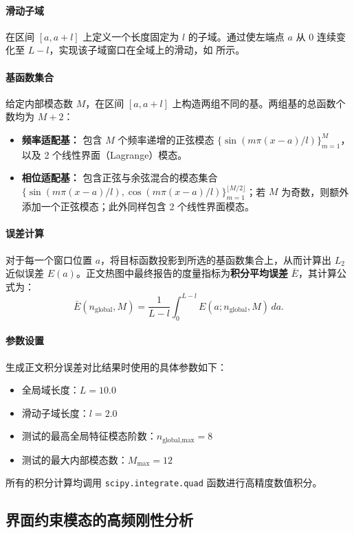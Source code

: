 \paragraph{滑动子域}
在区间 $[a, a+l]$ 上定义一个长度固定为 $l$ 的子域。通过使左端点 $a$ 从 $0$ 连续变化至 $L-l$，实现该子域窗口在全域上的滑动，如  所示。

\paragraph{基函数集合}
给定内部模态数 $M$，在区间 $[a, a+l]$ 上构造两组不同的基。两组基的总函数个数均为 $M+2$：
\begin{itemize}
    \item \textbf{频率适配基：} 包含 $M$ 个频率递增的正弦模态 $\{ \sin(m\pi(x-a)/l) \}_{m=1}^M$，以及 2 个线性界面（Lagrange）模态。
    \item \textbf{相位适配基：} 包含正弦与余弦混合的模态集合 $\{ \sin(m\pi(x-a)/l), \cos(m\pi(x-a)/l) \}_{m=1}^{\lfloor M/2 \rfloor}$；若 $M$ 为奇数，则额外添加一个正弦模态；此外同样包含 2 个线性界面模态。
\end{itemize}

\paragraph{误差计算}
对于每一个窗口位置 $a$，将目标函数投影到所选的基函数集合上，从而计算出 $L_2$ 近似误差 $E(a)$。正文热图中最终报告的度量指标为\textbf{积分平均误差} $\bar{E}$，其计算公式为：
\begin{equation}
\bar{E}(n_{\text{global}}, M) = \frac{1}{L-l} \int_{0}^{L-l} E(a; n_{\text{global}}, M) \, da.
\end{equation}

\paragraph{参数设置}
生成正文积分误差对比结果时使用的具体参数如下：
\begin{itemize}
    \item 全局域长度：$L = 10.0$
    \item 滑动子域长度：$l = 2.0$
    \item 测试的最高全局特征模态阶数：$n_{\text{global,max}} = 8$
    \item 测试的最大内部模态数：$M_{\text{max}} = 12$
\end{itemize}
所有的积分计算均调用 \texttt{scipy.integrate.quad} 函数进行高精度数值积分。
\subsection{界面约束模态的高频刚性分析}\label{sec:schur-complement}

